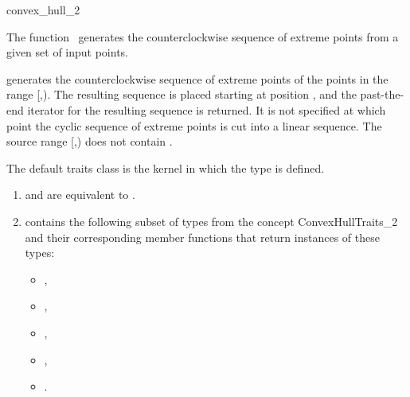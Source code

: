 

\begin{ccRefFunction}{convex_hull_2}  %

\ccDefinition
  
The function \ccRefName\ generates the counterclockwise sequence of extreme
points from a given set of input points.  


            {generates the counterclockwise sequence of extreme points
            of the points in the range [,).
            The resulting sequence is placed starting at position
            , and the past-the-end iterator for the resulting
            sequence is returned. It is not specified at which point the
            cyclic sequence of extreme points is cut into a linear sequence.
            \ccPrecond %
            The source range [,) does not contain
            .}

The default traits class  is the kernel in which
the type  is defined. 

\begin{enumerate}
   \item    {} and 
            are equivalent to .
   \item    {} contains the following subset of types from
            the concept ConvexHullTraits\_2 and their corresponding member
            functions that return instances of these types:
            \begin{itemize}
                \item {},
		\item {},
                \item {}, 
                \item {},
                \item {}.
            \end{itemize}
\end{enumerate}



\end{ccRefFunction}
